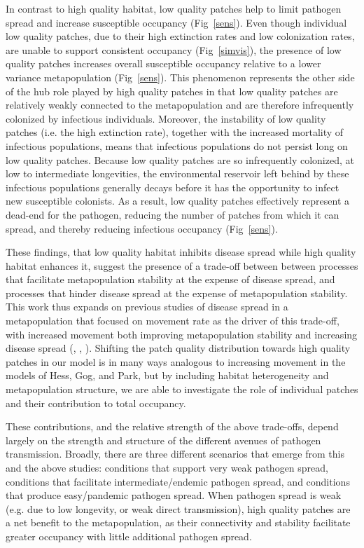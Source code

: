 \documentclass{svjour3}
\begin{document}
In contrast to high quality habitat, low quality patches help to limit pathogen spread and increase susceptible occupancy (Fig~\ref{sens}). Even though individual low quality patches, due to their high extinction rates and low colonization rates, are unable to support consistent occupancy (Fig~\ref{simvis}), the presence of low quality patches increases overall susceptible occupancy relative to a lower variance metapopulation (Fig~\ref{sens}).  This phenomenon represents the other side of the hub role played by high quality patches in that low quality patches are relatively weakly connected to the metapopulation and are therefore infrequently colonized by infectious individuals.  Moreover, the instability of low quality patches (i.e. the high extinction rate), together with the increased mortality of infectious populations, means that infectious populations do not persist long on low quality patches.  Because low quality patches are so infrequently colonized, at low to intermediate longevities, the environmental reservoir left behind by these infectious populations generally decays before it has the opportunity to infect new susceptible colonists.  As a result, low quality patches effectively represent a dead-end for the pathogen, reducing the number of patches from which it can spread, and thereby reducing infectious occupancy (Fig~\ref{sens}). 

These findings, that low quality habitat inhibits disease spread while high quality habitat enhances it, suggest the presence of a trade-off between between processes that facilitate metapopulation stability at the expense of disease spread, and processes that hinder disease spread at the expense of metapopulation stability.  This work thus expands on previous studies of disease spread in a metapopulation that focused on movement rate as the driver of this trade-off, with increased movement both improving metapopulation stability and increasing disease spread (\cite{Hess1996}, \cite{Gog2002}, \cite{Park2012}).  Shifting the patch quality distribution towards high quality patches in our model is in many ways analogous to increasing movement in the models of Hess, Gog, and Park, but by including habitat heterogeneity and metapopulation structure, we are able to investigate the role of individual patches and their contribution to total occupancy.

These contributions, and the relative strength of the above trade-offs, depend largely on the strength and structure of the different avenues of pathogen transmission.  Broadly, there are three different scenarios that emerge from this and the above studies: conditions that support very weak pathogen spread, conditions that facilitate intermediate/endemic pathogen spread, and conditions that produce easy/pandemic pathogen spread.  When pathogen spread is weak (e.g. due to low longevity, or weak direct transmission), high quality patches are a net benefit to the metapopulation, as their connectivity and stability facilitate greater occupancy with little additional pathogen spread.  
\end{document}

